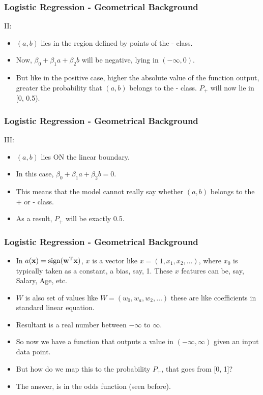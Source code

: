 \begin{frame}[fragile]\frametitle{Logistic Regression - Geometrical Background}
II:
\begin{itemize}
\item $(a, b)$ lies in the region defined by points of the - class. 
\item Now, $\beta_0 + \beta_1 a + \beta_2 b$ will be negative, lying in $(-\infty, 0)$. 
\item But like in the positive case, higher the absolute value of the function output, greater the probability that $(a, b)$ belongs to the - class. $P_+$ will now lie in [0, 0.5).

\end{itemize}

\end{frame}

\begin{frame}[fragile]\frametitle{Logistic Regression - Geometrical Background}
III:
\begin{itemize}
\item $(a, b)$ lies ON the linear boundary. 
\item In this case, $\beta_0 + \beta_1 a + \beta_2 b = 0$. 
\item This means that the model cannot really say whether $(a, b)$ belongs to the + or - class. 
\item As a result, $P_+$ will be exactly 0.5.

\end{itemize}

\end{frame}

\begin{frame}[fragile]\frametitle{Logistic Regression - Geometrical Background}

\begin{itemize}
\item  In $a(\textbf{x}) = \text{sign}(\textbf{w}^\text{T}\textbf x)$, $x$ is a vector like $x = (1, x_1,x_2,\ldots)$, where $x_0$ is typically taken as a constant, a bias, say, 1. These $x$ features can be, say, Salary, Age, etc.
\item $W$ is also set of values like $W = (w_0, w_a,w_2,\ldots)$ these are like coefficients in standard linear equation.
\item Resultant is a real number between $-\infty$ to $\infty$.
\item So now we have a function that outputs a value in $(-\infty, \infty)$ given an input data point. \item But how do we map this to the probability  $P_+$, that goes from [0, 1]? 
\item The answer, is in the odds function (seen before).
\end{itemize}

\end{frame}

